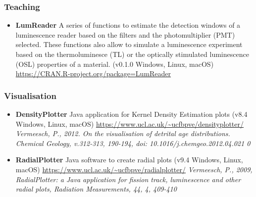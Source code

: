 \documentclass[]{article}
\providecommand{\tightlist}{%
  \setlength{\itemsep}{0pt}\setlength{\parskip}{0pt}}
\begin{document}
\hypertarget{teaching}{%
\subsubsection{Teaching}\label{teaching}}

\begin{itemize}
\tightlist
\item
  \textbf{LumReader}
  A series of functions to estimate the detection windows of a luminescence reader based on the filters and the photomultiplier (PMT) selected. These functions also allow to simulate a luminescence experiment based on the thermoluminesce (TL) or the optically stimulated luminescence (OSL) properties of a material.
  (v0.1.0 \textbar{} Windows, Linux, macOS)
  \url{https://CRAN.R-project.org/package=LumReader}
\end{itemize}

\hypertarget{visualisation}{%
\subsubsection{Visualisation}\label{visualisation}}

\begin{itemize}
\tightlist
\item
  \textbf{DensityPlotter}
  Java application for Kernel Density Estimation plots
  (v8.4 \textbar{} Windows, Linux, macOS)
  \url{https://www.ucl.ac.uk/~ucfbpve/densityplotter/}
  \emph{Vermeesch, P., 2012. On the visualisation of detrital age distributions. Chemical Geology, v.312-313, 190-194, doi: 10.1016/j.chemgeo.2012.04.021 0}
\item
  \textbf{RadialPlotter}
  Java software to create radial plots
  (v9.4 \textbar{} Windows, Linux, macOS)
  \url{https://www.ucl.ac.uk/~ucfbpve/radialplotter/}
  \emph{Vermeesch, P., 2009, RadialPlotter: a Java application for fission track, luminescence and other radial plots, Radiation Measurements, 44, 4, 409-410}
\end{itemize}
\end{document}
